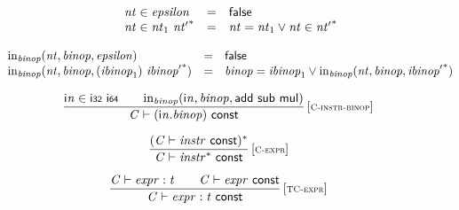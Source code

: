 $$
\begin{array}{@{}lcl@{}l@{}}
{\mathit{nt}} \in {\mathit{epsilon}} &=& \mathsf{false} &  \\
{\mathit{nt}} \in {\mathit{nt}}_{{1}}~{{\mathit{nt}'}^\ast} &=& {\mathit{nt}} = {\mathit{nt}}_{{1}} \lor {\mathit{nt}} \in {{\mathit{nt}'}^\ast} &  \\
\end{array}
$$

$$
\begin{array}{@{}lcl@{}l@{}}
{\mathrm{in}}_{{\mathit{binop}}}({\mathit{nt}}, {\mathit{binop}}, {\mathit{epsilon}}) &=& \mathsf{false} &  \\
{\mathrm{in}}_{{\mathit{binop}}}({\mathit{nt}}, {\mathit{binop}}, ({\mathit{ibinop}}_{{1}})~{{\mathit{ibinop}'}^\ast}) &=& {\mathit{binop}} = {\mathit{ibinop}}_{{1}} \lor {\mathrm{in}}_{{\mathit{binop}}}({\mathit{nt}}, {\mathit{binop}}, {{\mathit{ibinop}'}^\ast}) &  \\
\end{array}
$$

$$
\begin{array}{@{}c@{}}\displaystyle
\frac{
{\mathsf{i}}{{\mathit{n}}} \in \mathsf{i{\scriptstyle32}}~\mathsf{i{\scriptstyle64}}
 \qquad
{\mathrm{in}}_{{\mathit{binop}}}({\mathsf{i}}{{\mathit{n}}}, {\mathit{binop}}, \mathsf{add}~\mathsf{sub}~\mathsf{mul})
}{
{\mathit{C}} \vdash ({\mathsf{i}}{{\mathit{n}}} . {\mathit{binop}})~\mathsf{const}
} \, {[\textsc{\scriptsize C{-}instr{-}binop}]}
\qquad
\end{array}
$$

\vspace{1ex}

$$
\begin{array}{@{}c@{}}\displaystyle
\frac{
({\mathit{C}} \vdash {\mathit{instr}}~\mathsf{const})^\ast
}{
{\mathit{C}} \vdash {{\mathit{instr}}^\ast}~\mathsf{const}
} \, {[\textsc{\scriptsize C{-}expr}]}
\qquad
\end{array}
$$

\vspace{1ex}

$$
\begin{array}{@{}c@{}}\displaystyle
\frac{
{\mathit{C}} \vdash {\mathit{expr}} : {\mathit{t}}
 \qquad
{\mathit{C}} \vdash {\mathit{expr}}~\mathsf{const}
}{
{\mathit{C}} \vdash {\mathit{expr}} : {\mathit{t}}~\mathsf{const}
} \, {[\textsc{\scriptsize TC{-}expr}]}
\qquad
\end{array}
$$

\vspace{1ex}


